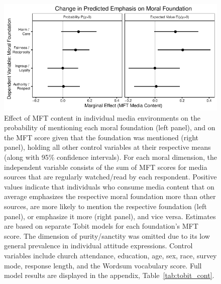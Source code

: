 \documentclass[12pt]{article}
\begin{document}
\begin{figure}[ht]\centering
\includegraphics{../calc/fig/tobit_cont.pdf}
\caption{Effect of MFT content in individual media environments on the probability of mentioning each moral foundation (left panel), and on the MFT score given that the foundation was mentioned (right panel), holding all other control variables at their respective means (along with 95\% confidence intervals). For each moral dimension, the independent variable consists of the sum of MFT scores for media sources that are regularly watched/read by each respondent. Positive values indicate that individuals who consume media content that on average emphasizes the respective moral foundation more than other sources, are more likely to mention the respective foundation (left panel), or emphasize it more (right panel), and vice versa. Estimates are based on separate Tobit models for each foundation's MFT score. The dimension of purity/sanctity was omitted due to its low general prevalence in individual attitude expressions. Control variables include church attendance, education, age, sex, race, survey mode, response length, and the Wordsum vocabulary score. Full model results are displayed in the appendix, Table~\ref{tab:tobit_cont}.
}\label{fig:tobit_cont}
\end{figure}
\end{document}
